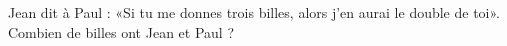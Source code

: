 
\begin{exercice}\label{exo2smath-0278}

    Jean dit à Paul : «Si tu me donnes trois billes, alors j'en aurai le double de toi». Combien de billes ont Jean et Paul ? 

\end{exercice}
